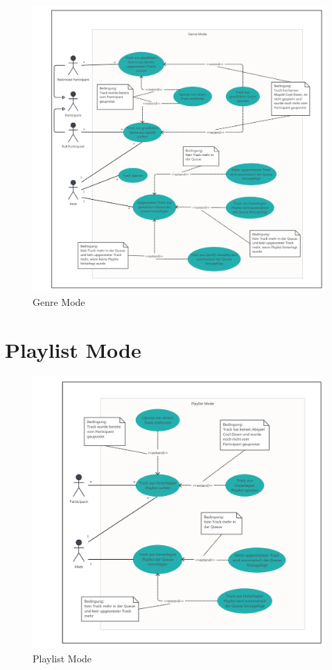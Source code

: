 \documentclass[oneside, ngerman]{sdqtechreport}
\begin{document}
\begin{figure}[h]
    \includegraphics[width = 16cm]{LATEX/Pflichtenheft/GraphicDesigns/Use Case Genre Mode.png}
    \caption{Genre Mode}
    \label{fig:Use Case Genre Mode}
\end{figure}

\newpage

\section{Playlist Mode}
\label{sec:Anwendungsfälle:Playlist Mode}

\begin{figure}[h]
    \includegraphics[width = 16cm]{LATEX/Pflichtenheft/GraphicDesigns/Use Case Playlist Mode.png}
    \caption{Playlist Mode}
    \label{fig:Use Case Playlist Mode}
\end{figure}
\end{document}
